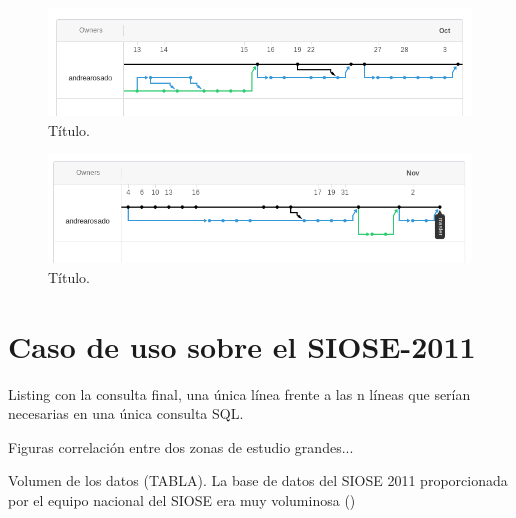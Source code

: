 \begin{figure}
\begin{center}
\includegraphics[width=\textwidth]{ResultadosyDiscusion/Figs/network-1.png}
\caption{Título. \label{fig:network1}}
\end{center}
\end{figure}

\begin{figure}
\begin{center}
\includegraphics[width=\textwidth]{ResultadosyDiscusion/Figs/network-2.png}
\caption{Título. \label{fig:network2}}
\end{center}
\end{figure}


\section{Caso de uso sobre el SIOSE-2011 \label{sec:caso_uso}}


Listing con la consulta final, una única línea frente a las n líneas que serían necesarias en una única consulta SQL.

Figuras correlación entre dos zonas de estudio grandes...


Volumen de los datos (TABLA). La base de datos del SIOSE 2011 proporcionada por el equipo nacional del SIOSE era muy voluminosa ()



